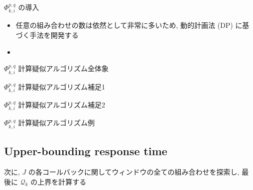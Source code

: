 \begin{frame}{$\Phi_{k, i}^{p, q}$ の導入}
    \begin{itemize}
        \item 任意の組み合わせの数は依然として非常に多いため, 動的計画法 (DP) に基づく手法を開発する
        \item {}
    \end{itemize}
\end{frame}

\begin{frame}{$\Phi_{k, i}^{p, q}$ 計算疑似アルゴリズム全体象}
\end{frame}

\begin{frame}{$\Phi_{k, i}^{p, q}$ 計算疑似アルゴリズム補足1}
\end{frame}

\begin{frame}{$\Phi_{k, i}^{p, q}$ 計算疑似アルゴリズム補足2}
\end{frame}

\begin{frame}{$\Phi_{k, i}^{p, q}$ 計算疑似アルゴリズム例}
\end{frame}


\subsection{Upper-bounding response time}
\label{ssec: upper bounding response time}

\begin{frame}{}
    次に, $J$ の各コールバックに関してウィンドウの全ての組み合わせを探索し, 最後に $\mathcal{Q}_{k}$ の上界を計算する
\end{frame}

